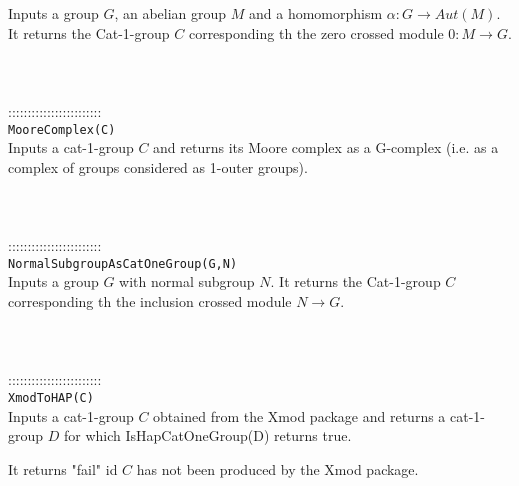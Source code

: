 \documentclass[a4paper,11pt]{report}
\begin{document}
{ Inputs a group $G$, an abelian group $M$ and a homomorphism $\alpha\colon G\rightarrow Aut(M)$. It returns the Cat-1-group $C$ corresponding th the zero crossed module $0\colon M\rightarrow G$. \\
 \\
 \\
 \\
 ::::::::::::::::::::::::\\
 \texttt{MooreComplex(C)}\\
 

 Inputs a cat-1-group $C$ and returns its Moore complex as a G-complex (i.e. as a complex of groups
considered as 1-outer groups). \\
 \\
 \\
 \\
 ::::::::::::::::::::::::\\
 \texttt{NormalSubgroupAsCatOneGroup(G,N)}\\
 

 Inputs a group $G$ with normal subgroup $N$. It returns the Cat-1-group $C$ corresponding th the inclusion crossed module $ N\rightarrow G$. \\
 \\
 \\
 \\
 ::::::::::::::::::::::::\\
 \texttt{XmodToHAP(C)}\\
 

 Inputs a cat-1-group $C$ obtained from the Xmod package and returns a cat-1-group $D$ for which IsHapCatOneGroup(D) returns true. 

 It returns "fail" id $C$ has not been produced by the Xmod package. \\
 \\
 \\
 }

 
\end{document}
